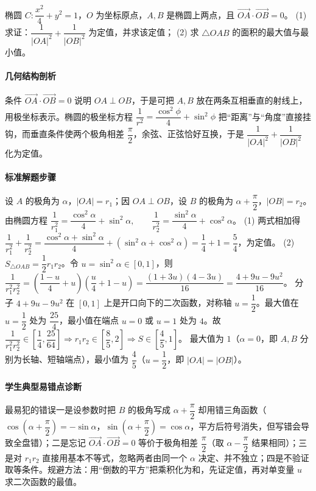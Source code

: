 \begin{problem}
椭圆 $C:\dfrac{x^2}{4}+y^2=1$，$O$ 为坐标原点，$A,B$ 是椭圆上两点，且 $\overrightarrow{OA}\cdot\overrightarrow{OB}=0$。
(1) 求证：$\dfrac{1}{|OA|^2}+\dfrac{1}{|OB|^2}$ 为定值，并求该定值；
(2) 求 $\triangle OAB$ 的面积的最大值与最小值。
\end{problem}
\begin{solution}
\paragraph{几何结构剖析}
条件 $\overrightarrow{OA}\cdot\overrightarrow{OB}=0$ 说明 $OA\perp OB$，于是可把 $A,B$ 放在两条互相垂直的射线上，用极坐标表示。椭圆的极坐标方程 $\dfrac1{r^2}=\dfrac{\cos^2\phi}{4}+\sin^2\phi$ 把“距离”与“角度”直接挂钩，而垂直条件使两个极角相差 $\dfrac\pi2$，余弦、正弦恰好互换，于是 $\dfrac1{|OA|^2}+\dfrac1{|OB|^2}$ 化为定值。
\paragraph{标准解题步骤}
设 $A$ 的极角为 $\alpha$，$|OA|=r_1$；因 $OA\perp OB$，设 $B$ 的极角为 $\alpha+\dfrac\pi2$，$|OB|=r_2$。由椭圆方程
$\dfrac1{r_1^2}=\dfrac{\cos^2\alpha}{4}+\sin^2\alpha,\qquad
\dfrac1{r_2^2}=\dfrac{\sin^2\alpha}{4}+\cos^2\alpha$。
(1) 两式相加得
$\dfrac1{r_1^2}+\dfrac1{r_2^2}=\dfrac{\cos^2\alpha+\sin^2\alpha}{4}+(\sin^2\alpha+\cos^2\alpha)=\dfrac14+1=\dfrac54$，为定值。
(2) $S_{\triangle OAB}=\dfrac12 r_1r_2$。令 $u=\sin^2\alpha\in[0,1]$，则
$\dfrac1{r_1^2r_2^2}=\left(\dfrac{1-u}{4}+u\right)\left(\dfrac{u}{4}+1-u\right)=\dfrac{(1+3u)(4-3u)}{16}=\dfrac{4+9u-9u^2}{16}$。
分子 $4+9u-9u^2$ 在 $[0,1]$ 上是开口向下的二次函数，对称轴 $u=\dfrac12$。最大值在 $u=\dfrac12$ 处为 $\dfrac{25}{4}$，最小值在端点 $u=0$ 或 $u=1$ 处为 $4$。故
$\dfrac1{r_1^2r_2^2}\in\left[\dfrac14,\dfrac{25}{64}\right]\Rightarrow r_1r_2\in\left[\dfrac85,2\right]\Rightarrow S\in\left[\dfrac45,1\right]$。
最大值为 $1$（$\alpha=0$，即 $A,B$ 分别为长轴、短轴端点），最小值为 $\dfrac45$（$u=\dfrac12$，即 $|OA|=|OB|$）。
\paragraph{学生典型易错点诊断}
最易犯的错误一是设参数时把 $B$ 的极角写成 $\alpha+\dfrac\pi2$ 却用错三角函数（$\cos\left(\alpha+\dfrac\pi2\right)=-\sin\alpha$，$\sin\left(\alpha+\dfrac\pi2\right)=\cos\alpha$，平方后符号消失，但写错会导致全盘错）；二是忘记 $\overrightarrow{OA}\cdot\overrightarrow{OB}=0$ 等价于极角相差 $\dfrac\pi2$（取 $\alpha-\dfrac\pi2$ 结果相同）；三是对 $r_1r_2$ 直接用基本不等式，忽略两者由同一个 $\alpha$ 决定、并不独立；四是不验证取等条件。规避方法：用“倒数的平方”把乘积化为和，先证定值，再对单变量 $u$ 求二次函数的最值。
\end{solution}
